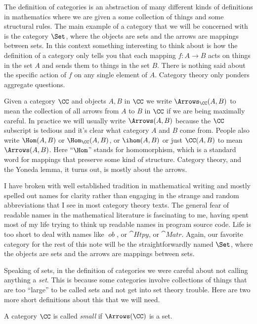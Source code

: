 \noindent
The definition of categories is an abstraction of many different kinds of definitions in
mathematics where we are given a some collection of things and some structural rules. The
main example of a category that we will be concerned with is the category $\Set$,
where the objects are sets and the arrows are mappings between sets. In this
context something interesting to think about is how the definition of a category only
tells you that each mapping $f: A \to B$ acts on things in the set $A$ and sends them to things in
the set $B$. There is nothing said about the specific action of $f$ on any single element of $A$.
Category theory only ponders aggregate questions.

Given a category $\CC$ and objects $A, B$ in $\CC$ we write 
$\Arrows_{\CC}(A, B)$ to mean the collection of all arrows 
from $A$ to $B$ in $\CC$ if we are being maximally careful. In practice
we will usually write $\Arrows(A,B)$ because the $\CC$ subscript is tedious and
it's clear what category $A$ and $B$ come from. People
also write $\Hom(A, B)$ or $\Hom_{\CC}(A,B)$, or $\ihom(A, B)$ or just $\CC(A,B)$ to mean
$\Arrows(A,B)$. Here ``$\Hom$'' stands for homomorphism, which is a standard word for
mappings that preserve some kind of structure. Category theory, and the Yoneda lemma,
it turns out, is mostly about the arrows.

\goodbreak
I have broken with well established tradition in mathematical writing and mostly
spelled out names for clarity rather than engaging in the strange and random abbreviations
that I see in most category theory texts. The general fear of readable names in the
mathematical literature is fascinating to me, having spent most of my life trying to think
up readable names in program source code. Life is too short to deal with names like
$\mathop{\mathit{ob}}$, or $\cat{Htpy}$, or $\cat{Matr}$. Again, our favorite category for the
rest of this note will be the straightforwardly named $\Set$, where the objects are sets and the
arrows are mappings between sets.

Speaking of sets, in the definition of categories we were careful about not calling
anything a {\it set}. This is because some categories involve collections of things that
are too ``large'' to be called sets and not get into set theory trouble. Here are two more
short definitions about this that we will need.

\begin{defn}
A category $\CC$ is called {\it small} if $\Arrows(\CC)$ is a set.
\end{defn}

